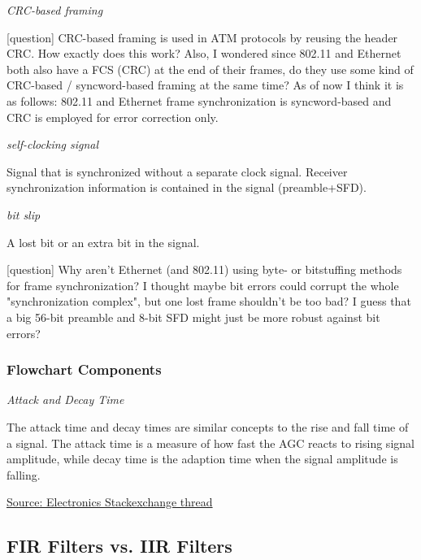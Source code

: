 \documentclass{article}
\begin{document}
\bigskip

\emph{CRC-based framing}

\color{blue}
[question] CRC-based framing is used in ATM protocols by reusing the header CRC. How exactly does this work? Also, I wondered since 802.11 and Ethernet both also have a FCS (CRC) at the end of their frames, do they use some kind of CRC-based / syncword-based framing at the same time? As of now I think it is as follows: 802.11 and Ethernet frame synchronization is syncword-based and CRC is employed for error correction only.
\color{black}

\bigskip

\emph{self-clocking signal}

Signal that is synchronized without a separate clock signal. Receiver synchronization information is contained in the signal (preamble+SFD).

\bigskip

\emph{bit slip}

A lost bit or an extra bit in the signal.

\bigskip

\color{blue}
[question] Why aren't Ethernet (and 802.11) using byte- or bitstuffing methods for frame synchronization? I thought maybe bit errors could corrupt the whole "synchronization complex", but one lost frame shouldn't be too bad? I guess that a big 56-bit preamble and 8-bit SFD might just be more robust against bit errors?
\color{black}

\subsubsection{Flowchart Components}

\emph{Attack and Decay Time}

The attack time and decay times are similar concepts to the rise and fall time of a signal. The attack time is a measure of how fast the AGC reacts to rising signal amplitude, while decay time is the adaption time when the signal amplitude is falling. 

\medskip

\href{https://electronics.stackexchange.com/questions/269223/attack-and-release-times-of-the-automatic-gain-control}{Source: Electronics Stackexchange thread}

\subsection{FIR Filters vs. IIR Filters}
\end{document}
